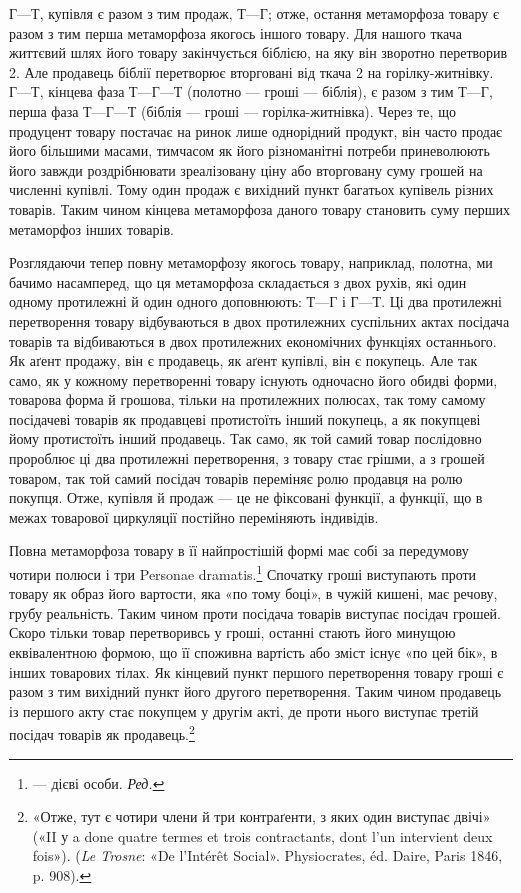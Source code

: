 $Г — Т$, купівля є разом з тим продаж, $Т — Г$; отже, остання
метаморфоза товару є разом з тим перша метаморфоза якогось
іншого товару. Для нашого ткача життєвий шлях його товару
закінчується біблією, на яку він зворотно перетворив 2. Але продавець біблії перетворює вторговані від ткача
2 на горілку-житнівку. $Г — Т$, кінцева фаза
$Т — Г — Т$ (полотно — гроші — біблія), є разом з тим $Т — Г$,
перша фаза $Т — Г — Т$ (біблія — гроші — горілка-житнівка).
Через те, що продуцент товару постачає на ринок лише однорідний
продукт, він часто продає його більшими масами, тимчасом
як його різноманітні потреби приневолюють його завжди
роздрібнювати зреалізовану ціну або вторговану суму грошей
на численні купівлі. Тому один продаж є вихідний пункт багатьох
купівель різних товарів. Таким чином кінцева метаморфоза
даного товару становить суму перших метаморфоз інших товарів.

Розглядаючи тепер повну метаморфозу якогось товару, наприклад,
полотна, ми бачимо насамперед, що ця метаморфоза
складається з двох рухів, які один одному протилежні й один
одного доповнюють: $Т — Г$ і $Г — Т$. Ці два протилежні перетворення
товару відбуваються в двох протилежних суспільних
актах посідача товарів та відбиваються в двох протилежних
економічних функціях останнього. Як аґент продажу, він є продавець,
як аґент купівлі, він є покупець. Але так само, як у
кожному перетворенні товару існують одночасно його обидві
форми, товарова форма й грошова, тільки на протилежних полюсах,
так тому самому посідачеві товарів як продавцеві протистоїть
інший покупець, а як покупцеві йому протистоїть інший продавець.
Так само, як той самий товар послідовно пророблює ці два протилежні
перетворення, з товару стає грішми, а з грошей товаром, так
той самий посідач товарів переміняє ролю продавця на ролю покупця.
Отже, купівля й продаж — це не фіксовані функції, а функції,
що в межах товарової циркуляції постійно переміняють індивідів.

Повна метаморфоза товару в її найпростішій формі має собі
за передумову чотири полюси і три Personae dramatis.\footnote*{
— дієві особи. \emph{Ред.}
} Спочатку
гроші виступають проти товару як образ його вартости, яка
«по тому боці», в чужій кишені, має речову, грубу реальність.
Таким чином проти посідача товарів виступає посідач грошей.
Скоро тільки товар перетворивсь у гроші, останні стають його
минущою еквівалентною формою, що її споживна вартість або
зміст існує «по цей бік», в інших товарових тілах. Як кінцевий
пункт першого перетворення товару гроші є разом з тим вихідний
пункт його другого перетворення. Таким чином продавець
із першого акту стає покупцем у другім акті, де проти нього
виступає третій посідач товарів як продавець.\footnote{
«Отже, тут є чотири члени й три контраґенти, з яких один виступає
двічі» («II у a done quatre termes et trois contractants, dont l’un intervient
deux fois»). (\emph{Le Trosne}: «De l’Intérêt Social». Physiocrates, éd. Daire,
Paris 1846, p. 908).
}
